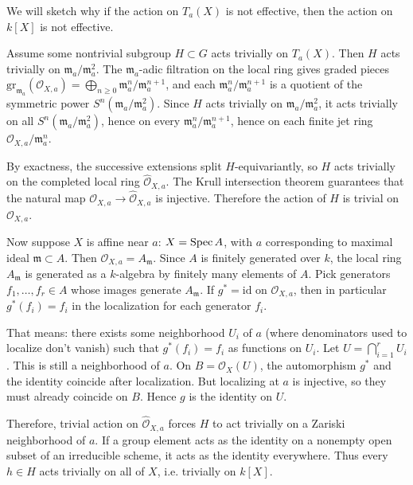 \documentclass[12pt]{article}
\begin{document}
\begin{remark}
We will sketch why if the action on $T_a(X)$ is not effective, then the action on $k[X]$ is not effective.

Assume some nontrivial subgroup $H\subset G$ acts trivially on $T_a(X)$. Then $H$ acts trivially on $\mathfrak m_a/\mathfrak m_a^2$.  The $\mathfrak m_a$-adic filtration on the local ring gives graded pieces $\mathrm{gr}_{\mathfrak m_a}(\mathcal O_{X,a}) = \bigoplus_{n\ge 0} \mathfrak m_a^n/\mathfrak m_a^{n+1}$, and each $\mathfrak m_a^n/\mathfrak m_a^{n+1}$ is a quotient of the symmetric power $S^n(\mathfrak m_a/\mathfrak m_a^2)$. Since $H$ acts trivially on $\mathfrak m_a/\mathfrak m_a^2$, it acts trivially on all $S^n(\mathfrak m_a/\mathfrak m_a^2)$, hence on every $\mathfrak m_a^n/\mathfrak m_a^{n+1}$, hence on each finite jet ring $\mathcal O_{X,a}/\mathfrak m_a^n$. 

By exactness, the successive extensions split $H$-equivariantly, so $H$ acts trivially on the completed local ring $\widehat{\mathcal O}_{X,a}$. The Krull intersection theorem guarantees that the natural map $\mathcal O_{X,a} \to \widehat{\mathcal O}_{X,a}$ is injective. Therefore the action of $H$ is trivial on $\mathcal O_{X,a}$.

Now suppose $X$ is affine near $a$: $X = \operatorname{Spec} A$, with $a$ corresponding to maximal ideal $\mathfrak m\subset A$. Then $\mathcal O_{X,a} = A_\mathfrak m$. Since $A$ is finitely generated over $k$, the local ring $A_\mathfrak m$ is generated as a $k$-algebra by finitely many elements of $A$. Pick generators $f_1,\dots,f_r\in A$ whose images generate $A_\mathfrak m$. If $g^*=\mathrm{id}$ on $\mathcal O_{X,a}$, then in particular $g^*(f_i)=f_i$ in the localization for each generator $f_i$.

That means: there exists some neighborhood $U_i$ of $a$ (where denominators used to localize don't vanish) such that $g^*(f_i)=f_i$ as functions on $U_i$. Let $U = \bigcap_{i=1}^r U_i$. This is still a neighborhood of $a$. On $B=\mathcal O_X(U)$, the automorphism $g^*$ and the identity coincide after localization. But localizing at $a$ is injective, so they must already coincide on $B$. Hence $g$ is the identity on $U$.

Therefore, trivial action on $\widehat{\mathcal O}_{X,a}$ forces $H$ to act trivially on a Zariski neighborhood of $a$. If a group element acts as the identity on a nonempty open subset of an irreducible scheme, it acts as the identity everywhere. Thus every $h\in H$ acts trivially on all of $X$, i.e. trivially on $k[X]$.
\end{remark}
\end{document}
